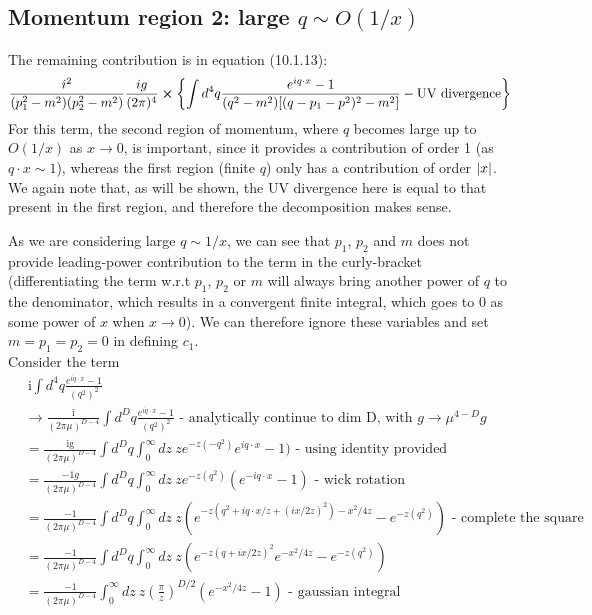 \documentclass{scrartcl}
\begin{document}
\subsection{Momentum region 2: large $q \sim O(1/x)$}\label{large q}
The remaining contribution is in equation (10.1.13):
\begin{equation} \label{eq:div_eg_large_q}
    \frac{i^2}{(p_1^2-m^2)(p_2^2-m^2)}\frac{ig}{(2\pi)^4}\cross\qty{\int d^4q \frac{e^{iq\cdot x}-1}{(q^2-m^2)[(q-p_1-p^2)^2-m^2]}-\text{UV divergence}}
\end{equation}
For this term, the second region of momentum, where $q$ becomes large up to $O(1/x)$ as $x \rightarrow 0$, is important, since it provides a contribution of order 1 (as $q\cdot x \sim 1$), whereas the first region (finite $q$) only has a contribution of order $\abs{x}$. We again note that, as will be shown, the UV divergence here is equal to that present in the first region, and therefore the decomposition makes sense. 

As we are considering large $q \sim 1/x$, we can see that $p_1$, $p_2$ and $m$ does not provide leading-power contribution to the term in the curly-bracket (differentiating the term w.r.t $p_1$, $p_2$ or $m$ will always bring another power of $q$ to the denominator, which results in a convergent finite integral, which goes to $0$ as some power of $x$ when $x \rightarrow 0$). We can therefore ignore these variables and set $m=p_1=p_2=0$ in defining $c_1$. \\

Consider the term
\begin{equation}
\begin{split}
    &\ \text{i}\int d^4q\frac{e^{iq\cdot x}-1}{(q^2)^2} \\
    &\rightarrow\frac{\text{i}}{(2\pi\mu)^{D-4}}\int d^Dq\frac{e^{iq\cdot x}-1}{(q^2)^2} \text{ - analytically continue to dim D, with } g \rightarrow \mu^{4-D}g\\
    &= \frac{\text{ig}}{(2\pi\mu)^{D-4}}\int d^Dq \int_0^\infty  dz\ z e^{-z(-q^2)} e^{iq\cdot x}-1) \text{ - using identity provided}\\
    &= \frac{-1g}{(2\pi\mu)^{D-4}}\int d^Dq \int_0^\infty  dz\ z e^{-z(q^2)} (e^{-iq\cdot x}-1) \text{ - wick rotation}\\
    &= \frac{-1}{(2\pi\mu)^{D-4}}\int d^Dq \int_0^\infty  dz\ z (e^{-z(q^2+iq\cdot x/z+(ix/2z)^2)-x^2/4z}-e^{-z(q^2)}) \text{ - complete the square}\\
    &= \frac{-1}{(2\pi\mu)^{D-4}}\int d^Dq \int_0^\infty  dz\ z (e^{-z(q+ix/2z)^2}e^{-x^2/4z}-e^{-z(q^2)})\\
    &= \frac{-1}{(2\pi\mu)^{D-4}}\int_0^\infty  dz\ z (\frac{\pi}{z})^{D/2}(e^{-x^2/4z}-1)\text{ - gaussian integral}\\
\end{split}
\end{equation}
\end{document}

